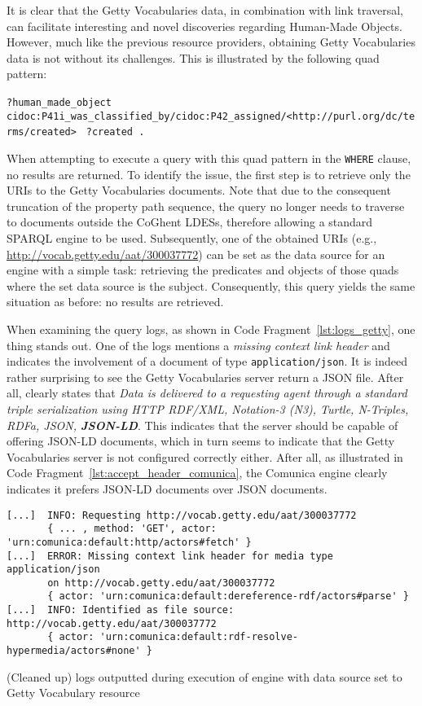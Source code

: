 It is clear that the Getty Vocabularies data, in combination with link traversal, can facilitate interesting and novel discoveries regarding Human-Made Objects. However, much like the previous resource providers, obtaining Getty Vocabularies data is not without its challenges. This is illustrated by the following quad pattern:
\begin{flushleft}
    \texttt{?human_made_object}
    \texttt{  cidoc:P41i_was_classified_by/cidoc:P42_assigned/<http://purl.org/dc/terms/created>}
    \texttt{      ?created .}
\end{flushleft}
When attempting to execute a query with this quad pattern in the \texttt{WHERE} clause, no results are returned. To identify the issue, the first step is to retrieve only the URIs to the Getty Vocabularies documents. Note that due to the consequent truncation of the property path sequence, the query no longer needs to traverse to documents outside the CoGhent LDESs, therefore allowing a standard SPARQL engine to be used. Subsequently, one of the obtained URIs (e.g., \url{http://vocab.getty.edu/aat/300037772}) can be set as the data source for an engine with a simple task: retrieving the predicates and objects of those quads where the set data source is the subject. Consequently, this query yields the same situation as before: no results are retrieved.

When examining the query logs, as shown in Code Fragment~\ref{lst:logs_getty}, one thing stands out. One of the logs mentions a \textit{missing context link header} and indicates the involvement of a document of type \texttt{application/json}. It is indeed rather surprising to see the Getty Vocabularies server return a JSON file. After all, \citet{getty2023lod} clearly states that \textit{Data is delivered to a requesting agent through a standard triple serialization using HTTP RDF/XML, Notation-3 (N3), Turtle, N-Triples, RDFa, JSON, \textbf{JSON-LD}}. This indicates that the server should be capable of offering JSON-LD documents, which in turn seems to indicate that the Getty Vocabularies server is not configured correctly either. After all, as illustrated in Code Fragment~\ref{lst:accept_header_comunica}, the Comunica engine clearly indicates it prefers JSON-LD documents over JSON documents.

\begin{listing}[htbp]
    \begin{verbatim}
[...]  INFO: Requesting http://vocab.getty.edu/aat/300037772
       { ... , method: 'GET', actor: 'urn:comunica:default:http/actors#fetch' }
[...]  ERROR: Missing context link header for media type application/json
       on http://vocab.getty.edu/aat/300037772
       { actor: 'urn:comunica:default:dereference-rdf/actors#parse' }
[...]  INFO: Identified as file source: http://vocab.getty.edu/aat/300037772
       { actor: 'urn:comunica:default:rdf-resolve-hypermedia/actors#none' }
    \end{verbatim}
    \caption{(Cleaned up) logs outputted during execution of engine with data source set to Getty Vocabulary resource}
    \label{lst:logs_getty}
\end{listing}


